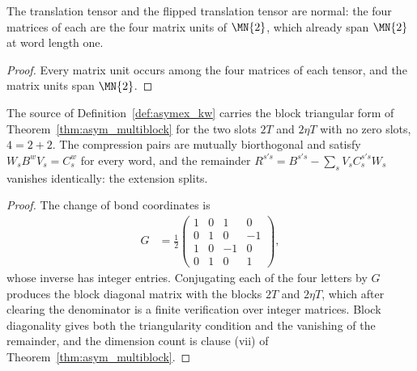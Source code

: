 \begin{theorem}
    \label{thm:asymex_kw_normal}
    \leanok
    The translation tensor and the flipped translation tensor are normal:
    the four matrices of each are the four matrix units of $\MN{2}$, which
    already span $\MN{2}$ at word length one.
\end{theorem}

\begin{proof}
    \leanok
    Every matrix unit occurs among the four matrices of each tensor, and
    the matrix units span $\MN{2}$.
\end{proof}

\begin{theorem}
    \label{thm:asymex_kw_compression}
    \leanok
    The source of Definition~\ref{def:asymex_kw} carries the block
    triangular form of Theorem~\ref{thm:asym_multiblock} for the two slots
    $2T$ and $2\eta T$ with no zero slots, $4=2+2$. The compression pairs
    are mutually biorthogonal and satisfy $W_sB^wV_s=C_s^w$ for every word,
    and the remainder $R^{s's}=B^{s's}-\sum_sV_sC_s^{s's}W_s$ vanishes
    identically: the extension splits.
\end{theorem}

\begin{proof}
    \leanok
    The change of bond coordinates is
    \begin{align}
        G & =\frac12\begin{pmatrix}
                        1 & 0 & 1  & 0  \\
                        0 & 1 & 0  & -1 \\
                        1 & 0 & -1 & 0  \\
                        0 & 1 & 0  & 1
                    \end{pmatrix},
        \label{eq:asymex_kw_gauge}
    \end{align}
    whose inverse has integer entries. Conjugating each of the four letters
    by $G$ produces the block diagonal matrix with the blocks $2T$ and
    $2\eta T$, which after clearing the denominator is a finite verification
    over integer matrices. Block diagonality gives both the triangularity
    condition and the vanishing of the remainder, and the dimension count is
    clause (vii) of Theorem~\ref{thm:asym_multiblock}.
\end{proof}

